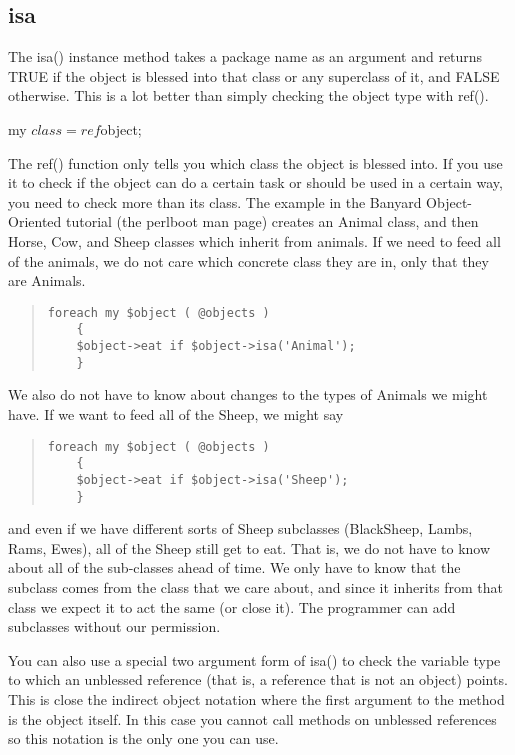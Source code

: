         \subsection{isa}

The isa() instance method takes a package name as an argument and
returns TRUE if the object is blessed into that class or any
superclass of it, and FALSE otherwise.  This is a lot better than
simply checking the object type with ref().

	my $class = ref $object;
	
The ref() function only tells you which class the object is blessed
into.  If you use it to check if the object can do a certain task or
should be used in a certain way, you need to check more than its
class.  The example in the Banyard Object-Oriented tutorial (the
perlboot man page) creates an Animal class, and then Horse, Cow,
and Sheep classes which inherit from animals.  If we need to feed
all of the animals, we do not care which concrete class they are in,
only that they are Animals.

\begin{quote}    
\begin{verbatim}
foreach my $object ( @objects )
	{
	$object->eat if $object->isa('Animal');
	}
\end{verbatim}
\end{quote}
	
We also do not have to know about changes to the types of Animals
we might have.  If we want to feed all of the Sheep, we might
say

\begin{quote}    
\begin{verbatim}
foreach my $object ( @objects )
	{
	$object->eat if $object->isa('Sheep');
	}
\end{verbatim}
\end{quote}

and even if we have different sorts of Sheep subclasses (BlackSheep,
Lambs, Rams, Ewes), all of the Sheep still get to eat.  That is,
we do not have to know about all of the sub-classes ahead of time.
We only have to know that the subclass comes from the class that
we care about, and since it inherits from that class we expect it
to act the same (or close it).  The programmer can add subclasses
without our permission.

You can also use a special two argument form of isa() to check the
variable type to which an unblessed reference  (that is, a reference
that is not an object) points.  This is close the  indirect object notation where the first argument to
the method is the object itself.  In this case you cannot call methods
on unblessed references so this notation is the only one you can use.

